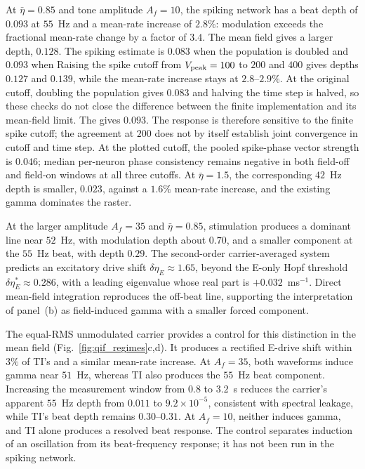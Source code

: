 \documentclass[11pt,a4paper]{article}
\providecommand{\DIFaddtex}[1]{{\protect\color{blue} \sf #1}} %
\providecommand{\DIFdeltex}[1]{{\protect\color{red} \scriptsize #1}} %
\providecommand{\DIFaddbegin}{} %
\providecommand{\DIFaddend}{} %
\providecommand{\DIFdelbegin}{} %
\providecommand{\DIFdelend}{} %
\providecommand{\DIFadd}[1]{\texorpdfstring{\DIFaddtex{#1}}{#1}} %
\providecommand{\DIFdel}[1]{\texorpdfstring{\DIFdeltex{#1}}{}} %
\begin{document}
At $\bar\eta=0.85$ and tone amplitude $A_f=10$, the spiking network has a beat
depth of $0.093$ at $55$~Hz and a mean-rate increase of $2.8\%$: modulation exceeds
the fractional mean-rate change by a factor of $3.4$. The mean field gives a
larger depth, $0.128$. \DIFdelbegin \DIFdel{The spiking estimate is $0.083$ when the population is
doubled and $0.093$ when }\DIFdelend \DIFaddbegin \DIFadd{Raising the spike cutoff from $V_{\rm peak}=100$ to
$200$ and $400$ gives depths $0.127$ and $0.139$, while the mean-rate increase
stays at $2.8$--$2.9\%$. At the original cutoff, doubling the population gives
$0.083$ and halving }\DIFaddend the time step \DIFdelbegin \DIFdel{is halved, so these checks do not close
the difference between the finite implementation and its mean-field limit.
The }\DIFdelend \DIFaddbegin \DIFadd{gives $0.093$. The response is therefore
sensitive to the finite spike cutoff; the agreement at $200$ does not by itself
establish joint convergence in cutoff and time step.
At the plotted cutoff, the }\DIFaddend pooled spike-phase vector strength is $0.046$;
median per-neuron phase consistency remains negative in \DIFdelbegin \DIFdel{both }\DIFdelend field-off and field-on
windows \DIFaddbegin \DIFadd{at all three cutoffs}\DIFaddend . At
$\bar\eta=1.5$, the corresponding $42$~Hz depth is smaller, $0.023$, against a
$1.6\%$ mean-rate increase, and the existing gamma dominates the raster.

At the larger amplitude $A_f=35$ and $\bar\eta=0.85$, stimulation produces
a dominant line near $52$~Hz, with modulation depth about $0.70$, and a smaller component
at the $55$~Hz beat, with depth $0.29$. The second-order carrier-averaged system
predicts an excitatory drive shift $\delta\eta_E\approx1.65$, beyond the E-only
Hopf threshold $\delta\eta_E^*\approx0.286$, with a leading eigenvalue whose real
part is $+0.032$~ms$^{-1}$. Direct mean-field integration reproduces the off-beat
line, supporting the interpretation of panel~(b) as field-induced gamma with a
smaller forced component.

The equal-RMS unmodulated carrier provides a control for this distinction in
the mean field (Fig.~\ref{fig:qif_regimes}c,d). It produces a rectified E-drive
shift within $3\%$ of TI's and a similar mean-rate increase. At $A_f=35$, both
waveforms induce gamma near $51$~Hz, whereas TI also produces the $55$~Hz beat
component. \DIFaddbegin \DIFadd{Increasing the measurement window from $0.8$ to $3.2$~s reduces
the carrier's apparent $55$~Hz depth from $0.011$ to $9.2\times10^{-5}$,
consistent with spectral leakage, while TI's beat depth remains $0.30$--$0.31$.
}\DIFaddend At $A_f=10$, neither induces gamma, and TI alone produces a resolved beat
response. The control separates induction of an oscillation from its
beat-frequency response; it has not been run in the spiking network.
\end{document}
